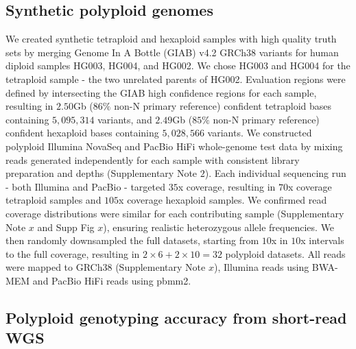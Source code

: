 \documentclass[notitlepage, twocolumn, 10pt]{article}
\begin{document}
\subsection*{Synthetic polyploid genomes} We created synthetic tetraploid and hexaploid samples with high quality truth sets by merging Genome In A Bottle (GIAB) v4.2 GRCh38 variants for human diploid samples HG003, HG004, and HG002. We chose HG003 and HG004 for the tetraploid sample - the two unrelated parents of HG002. Evaluation regions were defined by intersecting the GIAB high confidence regions for each sample, resulting in $2.50$Gb ($86\%$ non-N primary reference) confident tetraploid bases containing $5,095,314 $ variants, and $2.49$Gb ($85\%$ non-N primary reference) confident hexaploid bases containing $5,028,566$ variants. We constructed polyploid Illumina NovaSeq and PacBio HiFi whole-genome test data by mixing reads generated independently for each sample with consistent library preparation and depths (Supplementary Note $2$). Each individual sequencing run - both Illumina and PacBio - targeted $35$x coverage, resulting in $70$x coverage tetraploid samples and $105$x coverage hexaploid samples. We confirmed read coverage distributions were similar for each contributing sample (Supplementary Note $x$ and Supp Fig $x$), ensuring realistic heterozygous allele frequencies. We then randomly downsampled the full datasets, starting from $10$x in $10$x intervals to the full coverage, resulting in $2 \times 6 + 2 \times 10 = 32$ polyploid datasets. All reads were mapped to GRCh38 (Supplementary Note $x$), Illumina reads using BWA-MEM and PacBio HiFi reads using pbmm2.

\subsection*{Polyploid genotyping accuracy from short-read WGS}
\end{document}
